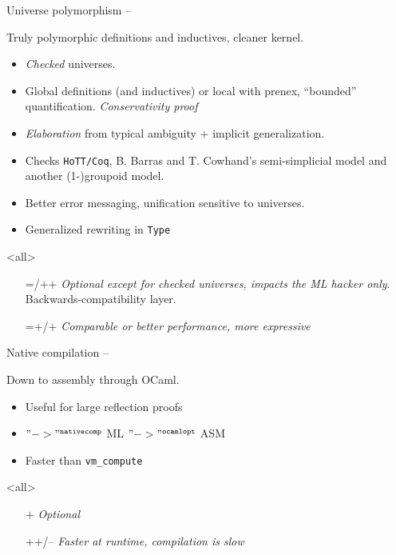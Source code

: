 
\begin{subsecframe}{Universe polymorphism -- }
  \begin{center}
    Truly polymorphic definitions and inductives, cleaner kernel. 
  \end{center}
  
  \begin{itemize}
  \item \emph{Checked} universes.
  \item Global definitions (and inductives) or local with prenex, ``bounded''
    quantification. \emph{Conservativity proof}
  \item \emph{Elaboration} from typical ambiguity + implicit
    generalization.
  \item Checks \texttt{HoTT/Coq}, B. Barras and T. Cowhand's semi-simplicial
    model and another (1-)groupoid model.
  \item Better error messaging, unification sensitive to universes.
  \item Generalized rewriting in \alert{\texttt{Type}}
  \end{itemize}
  \mode<all>

  \begin{itemize}
  \item[=/++] \emph{Optional except for checked
      universes, impacts the ML hacker only}. Backwards-compatibility layer.
  \item[=+/+] \emph{Comparable or better performance, more expressive}
  \end{itemize}
\end{subsecframe}


\begin{subsecframe}{Native compilation -- }
  \begin{center}
    Down to assembly through OCaml.
  \end{center}

  \begin{itemize}
  \item Useful for large reflection proofs
  \item \Coq $"->"^{\texttt{nativecomp}}$ \textsc{ML} $"->"^{\texttt{ocamlopt}}$ \textsc{ASM}
  \item Faster than \texttt{vm\_compute}
  \end{itemize}
  \mode<all>

  \begin{itemize}
  \item[+] \emph{Optional}
  \item[++/--] \emph{Faster at runtime, compilation is slow}
  \end{itemize}
\end{subsecframe}

